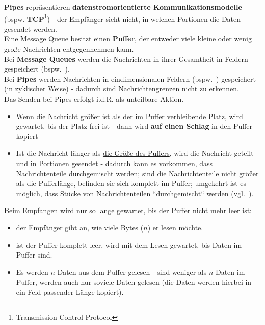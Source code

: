 \noindent
\textbf{Pipes} repräsentieren \textbf{datenstromorientierte Kommunikationsmodelle} (bspw. \textbf{TCP}\footnote{Transmission Control Protocol})  - der Empfänger sieht nicht, in welchen Portionen die Daten gesendet werden.\\

\noindent
Eine Message Queue besitzt einen \textbf{Puffer}, der entweder viele kleine oder wenig große Nachrichten entgegennehmen kann.\\

\noindent
Bei \textbf{Message Queues} werden die Nachrichten in ihrer Gesamtheit in Feldern gespeichert (bspw.~).\\

\noindent
Bei \textbf{Pipes} werden Nachrichten in eindimensionalen Feldern (bspw.~) gespeichert (in zyklischer Weise) - dadurch sind Nachrichtengrenzen nicht zu erkennen.\\

\noindent
Das Senden bei Pipes erfolgt i.d.R. als unteilbare Aktion.
\begin{itemize}
    \item Wenn die Nachricht größer ist als der \underline{im Puffer verbleibende Platz}, wird gewartet, bis der Platz frei ist - dann wird \textbf{auf einen Schlag} in den Puffer kopiert
    \item Ist die Nachricht länger als \underline{die Größe des Puffers}, wird die Nachricht geteilt und in Portionen gesendet - dadurch kann es vorkommen, dass Nachrichtenteile durchgemischt werden; sind die Nachrichtenteile nicht größer als die Pufferlänge, befinden sie sich komplett im Puffer;  umgekehrt ist es möglich, dass Stücke von Nachrichtenteilen ``durchgemischt`` werden (vgl.~\cite[117 f.]{Oec22}).
\end{itemize}

Beim Empfangen wird nur so lange gewartet, bis der Puffer nicht mehr leer ist:
\begin{itemize}
    \item der Empfänger gibt an, wie viele Bytes ($n$) er lesen möchte.
    \item ist der Puffer komplett leer, wird mit dem Lesen gewartet, bis Daten im Puffer sind.
    \item Es werden $n$ Daten aus dem Puffer gelesen - sind weniger als $n$ Daten im Puffer, werden auch nur soviele Daten gelesen (die Daten werden hierbei in ein Feld passender Länge kopiert).
\end{itemize}

